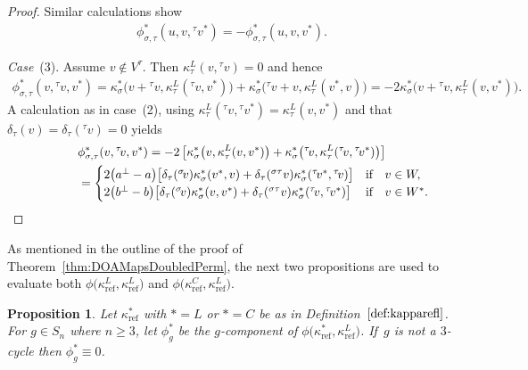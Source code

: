 \documentclass[10pt,a4paper]{amsart}
\numberwithin{equation}{section}
\newtheorem{Proposition}[Theorem]{Proposition}
 { \theoremstyle{definition}
\newtheorem{Definition}[Theorem]{Definition}
\newtheorem{Remark}[Theorem]{Remark}
\newtheorem{case}{Case}}
\newcommand{\actby}[1]{{}^{#1}}
\newcommand{\actbylessspace}[1]{{}^{#1}\!}
\DeclareMathOperator{\refl}{ref}
\begin{document}
\begin{proof}
Similar calculations show
\begin{gather*}
\phi^*_{\sigma,\tau}(u,v,\actbylessspace{\tau}v^*)=-\phi^*_{\sigma,\tau}(u,v,v^*).
\end{gather*}
		
\textit{Case}~(3). Assume $v \notin V^{\tau}$.
Then $\kappa^L_{\tau}(v,\actbylessspace{\tau}v)=0$ and hence
\begin{gather*}
\phi^*_{\sigma,\tau}(v,\actbylessspace{\tau}v,v^*) =\kappa^*_{\sigma}\big(v+\actbylessspace{\tau}v,\kappa^L_{\tau} (\actbylessspace{\tau}v,v^*)\big)+\kappa^*_{\sigma}\big(\actbylessspace{\tau}v+v,\kappa^L_{\tau}(v^*,v)\big)
=-2\kappa^*_{\sigma}\big(v+\actbylessspace{\tau}v,\kappa^L_{\tau}(v,v^*)\big).
\end{gather*}
A calculation as in case~(2), using
$\kappa^L_\tau(\actbylessspace{\tau}v,\actbylessspace{\tau}v^*)=\kappa^L_{\tau}(v,v^*)$
and that $\delta_{\tau}(v)=\delta_{\tau}(\actbylessspace{\tau}v)=0$ yields
\begin{gather*}
\phi^*_{\sigma,\tau}(v,\actbylessspace{\tau}v,v^*)
=-2\left[\kappa^*_{\sigma}\big(v,\kappa^L_{\tau}(v,v^*)\big) +\kappa^*_{\sigma}\big(\actbylessspace{\tau}v,\kappa^L_{\tau} (\actbylessspace{\tau}v,\actbylessspace{\tau}v^*)\big)\right]
\\ \hphantom{\phi^*_{\sigma,\tau}(v,\actbylessspace{\tau}v,v^*) }
=\begin{cases}
2\big(a^\perp-a\big)\big[\delta_{\tau}(\actbylessspace{\sigma}v)\kappa^*_{\sigma}(v^*,v) +\delta_{\tau}(\actby{\sigma\tau}v)\kappa^*_{\sigma}(\actbylessspace{\tau}v^*,\actbylessspace{\tau}v) \big] & \text{if}\quad v \in W,
\\
2\big(b^\perp-b\big)\big[\delta_{\tau}(\actbylessspace{\sigma}v)\kappa^*_{\sigma}(v,v^*) +\delta_{\tau}(\actby{\sigma\tau}v)\kappa^*_{\sigma}(\actbylessspace{\tau}v,\actbylessspace{\tau}v^*) \big] & \text{if}\quad v \in W^*.
\end{cases}	
\tag*{\qed}
\end{gather*}
\renewcommand{\qed}{}
\end{proof}

As mentioned in the outline of the proof of Theorem~\ref{thm:DOAMapsDoubledPerm}, the next two propositions are used to evaluate both $\phi\big(\kappa^L_{\refl},\kappa^L_{\refl}\big)$ and $\phi\big(\kappa^C_{\refl},\kappa^L_{\refl}\big)$.

\begin{Proposition}\label{prop:zerocases}
	Let $\kappa^{*}_{\refl}$ with $*=L$ or $*=C$ be as in Definition~$\ref{def:kapparefl}$.
	For $g \in S_n$ where $n \geq 3$, let $\phi^{*}_g$ be the $g$-component of $\phi\big(\kappa^{*}_{\refl},\kappa^L_{\refl}\big)$. If~$g$ is not a $3$-cycle then $\phi^{*}_g \equiv 0$.
\end{Proposition}
\end{document}
